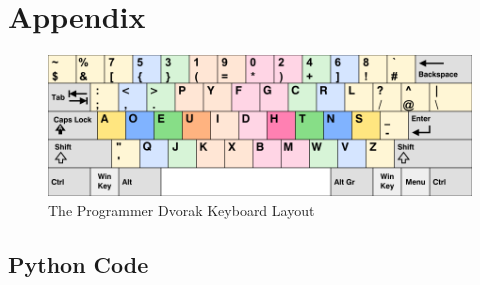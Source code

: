 \documentclass[12pt]{article}
\begin{document}
\section*{Appendix}

\begin{figure}[H]
	\caption{The Programmer Dvorak Keyboard Layout}
	\includegraphics[width=\textwidth]{programmer-dvorak.png}
\end{figure}

\subsection*{Python Code}
\end{document}
